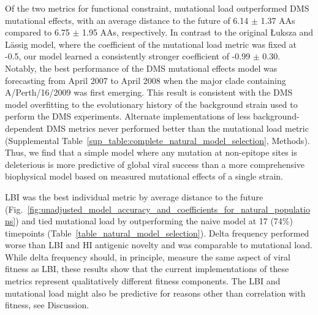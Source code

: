 Of the two metrics for functional constraint, mutational load outperformed DMS mutational effects, with an average distance to the future of 6.14 $\pm$ 1.37 AAs compared to 6.75 $\pm$ 1.95 AAs, respectively.
In contrast to the original {\L}uksza and L\"assig \cite{Luksza:2014hj} model, where the coefficient of the mutational load metric was fixed at -0.5, our model learned a consistently stronger coefficient of -0.99 $\pm$ 0.30.
Notably, the best performance of the DMS mutational effects model was forecasting from April 2007 to April 2008 when the major clade containing A/Perth/16/2009 was first emerging.
This result is consistent with the DMS model overfitting to the evolutionary history of the background strain used to perform the DMS experiments.
Alternate implementations of less background-dependent DMS metrics never performed better than the mutational load metric (Supplemental Table~\ref{sup_table:complete_natural_model_selection}, Methods).
Thus, we find that a simple model where any mutation at non-epitope sites is deleterious is more predictive of global viral success than a more comprehensive biophysical model based on measured mutational effects of a single strain.

LBI was the best individual metric by average distance to the future (Fig.~\ref{fig:unadjusted_model_accuracy_and_coefficients_for_natural_populations}) and tied mutational load by outperforming the naive model at 17 (74\%) timepoints (Table~\ref{table_natural_model_selection}).
Delta frequency performed worse than LBI and HI antigenic novelty and was comparable to mutational load.
While delta frequency should, in principle, measure the same aspect of viral fitness as LBI, these results show that the current implementations of these metrics represent qualitatively different fitness components.
The LBI and mutational load might also be predictive for reasons other than correlation with fitness, see Discussion.

